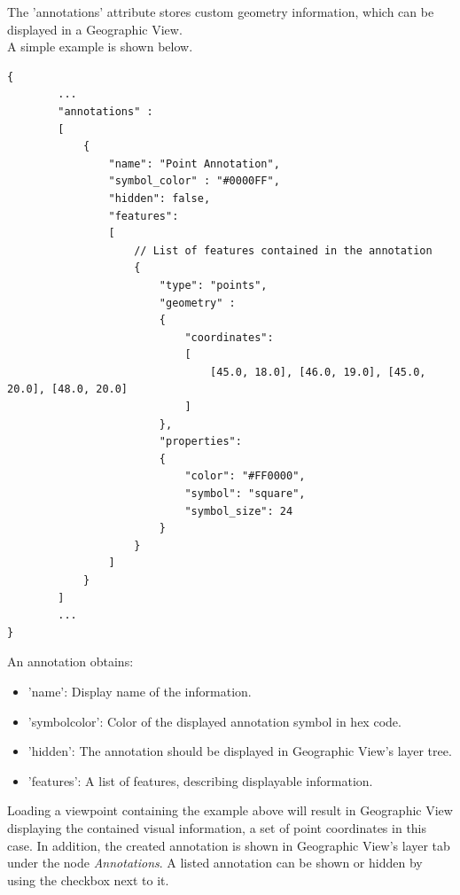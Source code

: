 The 'annotations' attribute stores custom geometry information, which can be displayed in a Geographic View. \\

A simple example is shown below.

\begin{lstlisting}[basicstyle=\small\ttfamily]
{
        ...
        "annotations" :
        [
            {
                "name": "Point Annotation", 
                "symbol_color" : "#0000FF",
                "hidden": false,
                "features":
                [
                    // List of features contained in the annotation 
                    {
                        "type": "points",
                        "geometry" :
                        {
                            "coordinates": 
                            [
                                [45.0, 18.0], [46.0, 19.0], [45.0, 20.0], [48.0, 20.0]
                            ]
                        },
                        "properties":
                        {
                            "color": "#FF0000",
                            "symbol": "square",
                            "symbol_size": 24
                        }
                    }    
                ]
            }
        ]
        ...
}
\end{lstlisting}

An annotation obtains: \\

\begin{itemize}
    \item 'name': Display name of the information.
    \item 'symbol\textunderscore color': Color of the displayed annotation symbol in hex code.
    \item 'hidden': The annotation should be displayed in Geographic View's layer tree.
    \item 'features': A list of features, describing displayable information. \\
\end{itemize}

Loading a viewpoint containing the example above will result in Geographic View displaying the contained visual information,
a set of point coordinates in this case. In addition, the created annotation is shown in Geographic View's layer tab under the node \textit{Annotations}.
A listed annotation can be shown or hidden by using the checkbox next to it. \\

